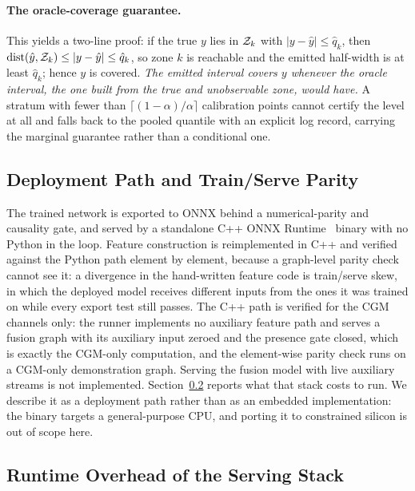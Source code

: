 \paragraph{The oracle-coverage guarantee.} This yields a two-line proof: if the true $y$ lies in $\mathcal{Z}_{k}$ with
$|y - \hat{y}| \le \hat{q}_k$, then
$\operatorname{dist}(\hat{y}, \mathcal{Z}_{k}) \le |y - \hat{y}| \le \hat{q}_k$, so zone $k$
is reachable and the emitted half-width is at least $\hat{q}_k$; hence $y$ is
covered. \emph{The emitted interval covers $y$ whenever the oracle interval, the
one built from the true and unobservable zone, would have.} A stratum with fewer
than $\lceil (1-\alpha)/\alpha \rceil$ calibration points cannot certify the
level at all and falls back to the pooled quantile with an explicit log record,
carrying the marginal guarantee rather than a conditional one.

\subsection{Deployment Path and Train/Serve Parity}
\label{sec:appendix_deployment}

The trained network is exported to ONNX behind a numerical-parity and causality
gate, and served by a standalone C++ ONNX Runtime~\citep{onnxruntime} binary with
no Python in the loop. Feature construction is reimplemented in C++ and verified
against the Python path element by element, because a graph-level parity check
cannot see it: a divergence in the hand-written feature code is train/serve skew,
in which the deployed model receives different inputs from the ones it was
trained on while every export test still passes.
The C++ path is verified for the CGM channels only: the runner implements no
auxiliary feature path and serves a fusion graph with its auxiliary input zeroed
and the presence gate closed, which is exactly the CGM-only computation, and
the element-wise parity check runs on a CGM-only demonstration graph. Serving
the fusion model with live auxiliary streams is not implemented.
Section~\ref{sec:edge} reports what that stack costs to run. We describe it as a
deployment path rather than as an embedded implementation: the binary targets a
general-purpose CPU, and porting it to constrained silicon is out of scope
here.

\subsection{Runtime Overhead of the Serving Stack}
\label{sec:edge}

